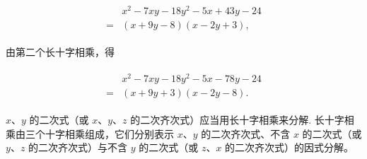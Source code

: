 \documentclass[10pt]{article}
\begin{document}
\begin{align*}
\begin{aligned}
& x^{2}-7 x y-18 y^{2}-5 x+43 y-24 \\
= & (x+9 y-8)(x-2 y+3),
\end{aligned}
\end{align*}

由第二个长十字相乘，得

\begin{align*}
\begin{aligned}
& x^{2}-7 x y-18 y^{2}-5 x-78 y-24 \\
= & (x+9 y+3)(x-2 y-8) .
\end{aligned}
\end{align*}

$x 、 y$ 的二次式（或 $x 、 y 、 z$ 的二次齐次式）应当用长十字相乘来分解. 长十字相乘由三个十字相乘组成，它们分别表示 $x 、 y$ 的二次齐次式、不含 $x$ 的二次式（或 $y 、 z$ 的二次齐次式）与不含 $y$ 的二次式（或 $z 、 x$ 的二次齐次式）的因式分解。
\end{document}
